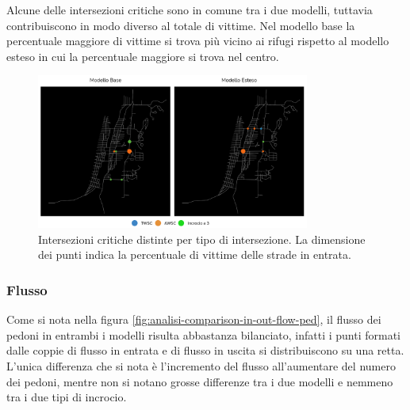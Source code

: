 Alcune delle intersezioni critiche sono in comune tra i due modelli, tuttavia contribuiscono in modo diverso al totale di vittime.
Nel modello base la percentuale maggiore di vittime si trova più vicino ai rifugi rispetto al modello esteso in cui la percentuale maggiore si trova nel centro.

\begin{figure}[ht]
    \centering
    \includegraphics[width=0.8\textwidth]{images/analisi/critical_ints_map.png}
    \caption{Intersezioni critiche distinte per tipo di intersezione. La dimensione dei punti indica la percentuale di vittime delle strade in entrata.}
    \label{fig:analisi-comparison-critical-ints2}
\end{figure}

\subsubsection*{Flusso}%
Come si nota nella figura \ref{fig:analisi-comparison-in-out-flow-ped}, il flusso dei pedoni
in entrambi i modelli risulta abbastanza bilanciato,
infatti i punti formati dalle coppie di flusso in entrata e di flusso in uscita si distribuiscono su una retta.
L'unica differenza che si nota è l'incremento del flusso all'aumentare del numero dei pedoni,
mentre non si notano grosse differenze tra i due modelli e nemmeno tra i due tipi di incrocio.

